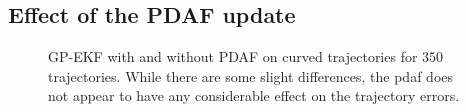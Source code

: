\subsection{Effect of the PDAF update}
\begin{figure}
    \centering
    \caption{GP-EKF with and without PDAF on curved trajectories for $350$ trajectories. While there are some slight differences, the \acrshort{pdaf} does not appear to have any considerable effect on the trajectory errors.}
    \label{fig:stats_gp_ekf_with_or_without_pdaf}
\end{figure}

